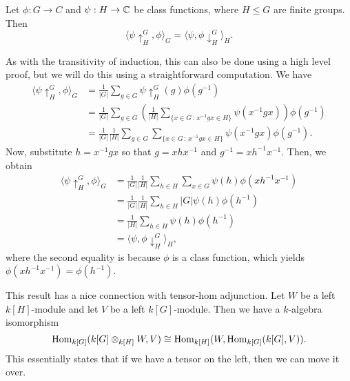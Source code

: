 \begin{theo}{}
    Let $\phi : G \to C$ and $\psi : H \to \mathbb{C}$ be class functions, where 
    $H \leq G$ are finite groups. Then 
    \[ \langle \psi \uparrow_H^G, \phi \rangle_G = \langle \psi, \phi \downarrow_H^G \rangle_H. \] 
\end{theo}
\begin{pf}
    As with the transitivity of induction, this can also be done using a high
    level proof, but we will do this using a straightforward computation. We have 
    \begin{align*}
        \langle \psi \uparrow_H^G, \phi \rangle_G 
        &= \frac{1}{|G|} \sum_{g \in G} \psi \uparrow_H^G (g) \phi(g^{-1}) \\ 
        &= \frac{1}{|G|} \sum_{g \in G} \left( \frac{1}{|H|} 
        \sum_{\{x\in G\,:\,x^{-1}gx\in H\}} \psi(x^{-1}gx) \right) \phi(g^{-1}) \\
        &= \frac{1}{|G|} \frac{1}{|H|} \sum_{g\in G} \sum_{\{x\in G\,:\,x^{-1}gx\in H\}}
        \psi(x^{-1}gx) \phi(g^{-1}). 
    \end{align*}
    Now, substitute $h = x^{-1}gx$ so that $g = xhx^{-1}$ and $g^{-1} = 
    xh^{-1}x^{-1}$. Then, we obtain 
    \begin{align*}
        \langle \psi \uparrow_H^G, \phi \rangle_G 
        &= \frac{1}{|G|} \frac{1}{|H|} \sum_{h \in H} \sum_{x \in G} \psi(h) \phi(xh^{-1}x^{-1}) \\ 
        &= \frac{1}{|G|} \frac{1}{|H|} \sum_{h \in H} |G| \psi(h) \phi(h^{-1}) \\ 
        &= \frac{1}{|H|} \sum_{h\in H} \psi(h) \phi(h^{-1}) \\ 
        &= \langle \psi, \phi \downarrow_H^G \rangle_H, 
    \end{align*}
    where the second equality is because $\phi$ is a class function, which yields 
    $\phi(xh^{-1}x^{-1}) = \phi(h^{-1})$. 
\end{pf}

This result has a nice connection with tensor-hom adjunction. Let 
$W$ be a left $k[H]$-module and let $V$ be a left $k[G]$-module. Then we have 
a $k$-algebra isomorphism 
\[ \operatorname{Hom}_{k[G]}(k[G] \otimes_{k[H]} W, V) \cong \operatorname{Hom}_{k[H]}(W, \operatorname{Hom}_{k[G]}(k[G], V)). \] 
This essentially states that if we have a tensor on the left, then we can move it over. 


